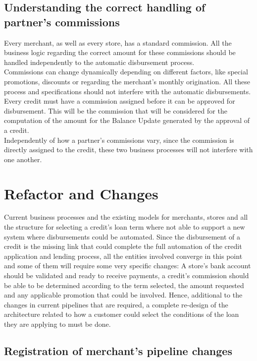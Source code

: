 \subsection{Understanding the correct handling of partner’s commissions}

Every merchant, as well as every store, has a standard commission. All the business logic regarding the correct amount for these commissions should be handled independently to the automatic disbursement process. \\

Commissions can change dynamically depending on different factors, like special promotions, discounts or regarding the merchant’s monthly origination. All these process and specifications should not interfere with the automatic disbursements. Every credit must have a commission assigned before it can be approved for disbursement. This will be the commission that will be considered for the computation of the amount for the Balance Update generated by the approval of a credit. \\

Independently of how a partner’s commissions vary, since the commission is directly assigned to the credit, these two business processes will not interfere with one another.

\section{Refactor and Changes}

Current business processes and the existing models for merchants, stores and all the structure for selecting a credit’s loan term where not able to support a new system where disbursements could be automated. Since the disbursement of a credit is the missing link that could complete the full automation of the credit application and lending process, all the entities involved converge in this point and some of them will require some very specific changes: A store’s bank account should be validated and ready to receive payments, a credit’s commission should be able to be determined according to the term selected, the amount requested and any applicable promotion that could be involved. Hence, additional to the changes in current pipelines that are required, a complete re-design of the architecture related to how a customer could select the conditions of the loan they are applying to must be done.

\subsection{Registration of merchant’s pipeline changes}

